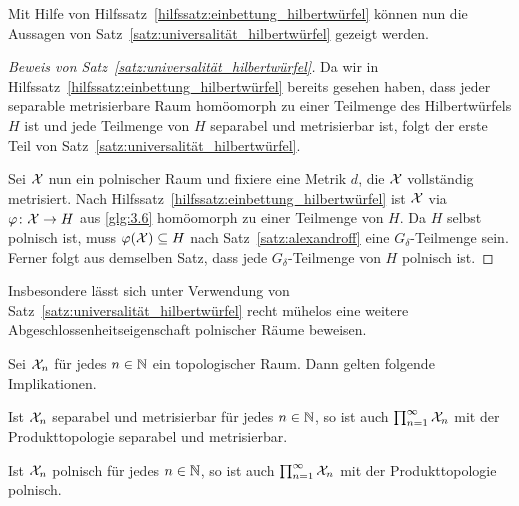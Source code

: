 \documentclass[../thesis/thesis.tex]{subfiles}
\begin{document}
	Mit Hilfe von Hilfssatz~\ref{hilfssatz:einbettung_hilbertwürfel} können nun die Aussagen von
	Satz~\ref{satz:universalität_hilbertwürfel} gezeigt werden.
	
	\begin{proof}[Beweis von Satz~\ref{satz:universalität_hilbertwürfel}]
		Da wir in Hilfssatz~\ref{hilfssatz:einbettung_hilbertwürfel} bereits 
		gesehen haben, dass jeder separable metrisierbare Raum homöomorph zu einer 
		Teilmenge des Hilbertwürfels $H$ ist und jede Teilmenge von $H$ separabel und metrisierbar ist,
		folgt der erste Teil von Satz~\ref{satz:universalität_hilbertwürfel}. 
		
		Sei $\mathcal{X}$ nun ein polnischer Raum und fixiere eine Metrik $d$, die $\mathcal{X}$ vollständig metrisiert. 
		Nach Hilfssatz~\ref{hilfssatz:einbettung_hilbertwürfel} ist $\mathcal{X}$ via $\varphi \colon \mathcal{X} \to H$ aus \eqref{glg:3.6}
		homöomorph zu einer Teilmenge von $H$. Da $H$ selbst polnisch ist, muss $\varphi(\mathcal{X}) \subseteq H$ nach 
		Satz~\ref{satz:alexandroff} eine $G_\delta$-Teilmenge sein.
		Ferner folgt aus demselben Satz, dass jede $G_\delta$-Teilmenge von $H$ polnisch ist.
	\end{proof}

	Insbesondere lässt sich unter Verwendung von Satz~\ref{satz:universalität_hilbertwürfel} recht mühelos eine weitere Abgeschlossenheitseigenschaft polnischer Räume beweisen.
	
	\begin{Folgerung}
		\label{folgerung:produkte_polnische_räume}
		Sei $\mathcal{X}_n$ für jedes $n \in \mathbb{N}$ ein topologischer Raum. Dann gelten folgende Implikationen.
		\begin{enumeratethm}
			\item Ist $\mathcal{X}_n$ separabel und metrisierbar für jedes $n \in \mathbb{N}$, so ist auch $\prod_{n=1}^{\infty} \mathcal{X}_n$ mit der Produkttopologie separabel und metrisierbar.
			\item Ist $\mathcal{X}_n$ polnisch für jedes $n \in \mathbb{N}$, so ist auch $\prod_{n=1}^{\infty} \mathcal{X}_n$ mit der Produkttopologie polnisch.
		\end{enumeratethm}
	\end{Folgerung}
	
\end{document}

